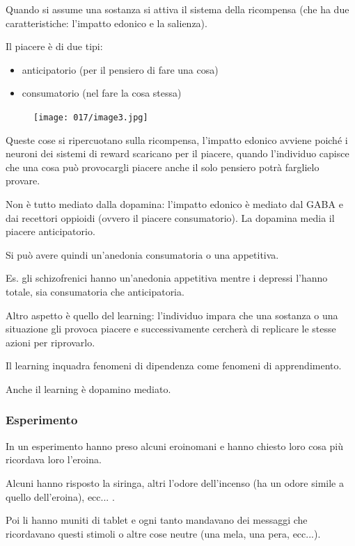 Quando si assume una sostanza si attiva il sistema della ricompensa (che
ha due caratteristiche: l'impatto edonico e la salienza).

Il piacere è di due tipi:

\begin{itemize}
\item
  anticipatorio (per il pensiero di
  fare una cosa)
\item
  consumatorio (nel fare la cosa stessa)
\end{itemize}

\begin{figure}[!ht]
\centering
	\texttt{[image: 017/image3.jpg]}
\end{figure}

Queste cose si ripercuotano sulla ricompensa, l'impatto edonico avviene
poiché i neuroni dei sistemi di reward scaricano per il piacere, quando
l'individuo capisce che una cosa può provocargli piacere anche il solo
pensiero potrà farglielo provare.

Non è tutto mediato dalla dopamina: l'impatto edonico è mediato dal GABA
e dai recettori oppioidi (ovvero il piacere consumatorio). La dopamina
media il piacere anticipatorio.

Si può avere quindi un'anedonia consumatoria o una appetitiva.

Es. gli schizofrenici hanno un'anedonia appetitiva mentre i depressi
l'hanno totale, sia consumatoria che anticipatoria.

Altro aspetto è quello del learning: l'individuo impara che una sostanza
o una situazione gli provoca piacere e successivamente cercherà di
replicare le stesse azioni per riprovarlo.

Il learning inquadra fenomeni di dipendenza come fenomeni di
apprendimento.

Anche il learning è dopamino mediato.

\subsubsection{Esperimento}

In un esperimento hanno preso alcuni eroinomani e hanno chiesto loro
cosa più ricordava loro l'eroina.

Alcuni hanno risposto la siringa, altri l'odore dell'incenso (ha un
odore simile a quello dell'eroina), ecc... .

Poi li hanno muniti di tablet e ogni tanto mandavano dei messaggi che
ricordavano questi stimoli o altre cose neutre (una mela, una pera,
ecc...).

